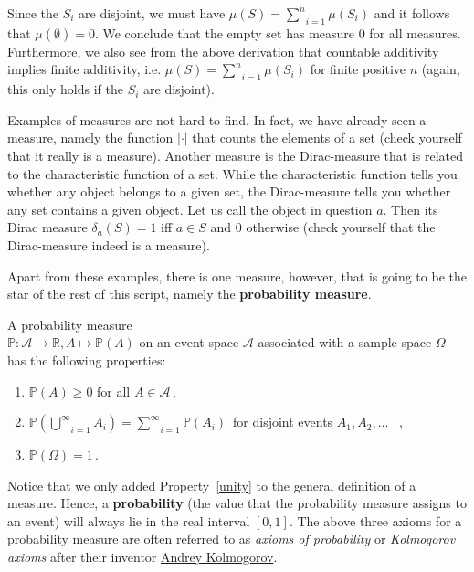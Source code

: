 Since the $ S_{i} $ are disjoint, we
must have $ \mu(S) = \underset{i=1}{\overset{n}{\sum}} \mu (S_{i}) $ and it follows that 
$ \mu(\emptyset) = 0 $. We conclude that the empty set has measure $ 0 $ for all measures. Furthermore, we also see from the above
derivation that countable additivity implies finite additivity, i.e.
$ \mu(S) = \underset{i=1}{\overset{n}{\sum}} \mu(S_{i}) $ for finite positive $ n $ (again, this only
holds if the $ S_{i} $ are disjoint).

Examples of measures are not hard to find. In fact, we have already seen a measure,
namely the function $ |\cdot| $ that counts the elements of a set (check yourself that it really is a 
measure). Another measure is the Dirac-measure that is related to the characteristic
function of a set. While the characteristic function tells you whether any object belongs to a given set,
the Dirac-measure tells you whether any set contains a given object. Let us call the object in question
$ a $. Then its Dirac measure $ \delta_{a}(S) = 1 $ iff $ a \in S $ and 0 otherwise (check yourself that the Dirac-measure indeed is a measure).

Apart from these examples, there is one measure, however, that is going to be the star of the rest of this 
script, namely the \textbf{probability measure}.

\begin{Definition}\label{def:probmeasure}
A probability measure \\ $ \mathbb{P}: \mathcal{A} \rightarrow \mathbb{R}, A \mapsto \mathbb{P}(A) $
on an event space $ \mathcal{A} $ associated with a sample space $ \Omega $ has the
following properties:
\begin{enumerate}
\item $ \mathbb{P}(A) \geq 0 $ for all $ A \in \mathcal{A} \,$,
\item $ \mathbb{P}\left( \underset{i = 1}{\overset{\infty}{\bigcup}} A_{i} \right)
= \underset{i = 1}{\overset{\infty}{\sum}} \mathbb{P} \left( A_{i} \right) \,$ for disjoint events $A_1,A_2,\ldots$ \, ,  \label{union}
\item $ \mathbb{P}(\Omega) = 1 \,$. \label{unity}
\end{enumerate}
\end{Definition}

Notice that we only added Property~\ref{unity} to the general definition of a measure. Hence, a
\textbf{probability} (the value that the probability measure assigns to an event) will always lie in the real interval 
$[0,1]$. The above three axioms for a probability measure are often referred to as \emph{axioms of probability}
or \emph{Kolmogorov axioms} after their inventor \href{https://en.wikipedia.org/wiki/Andrey_Kolmogorov}{Andrey
Kolmogorov}.

